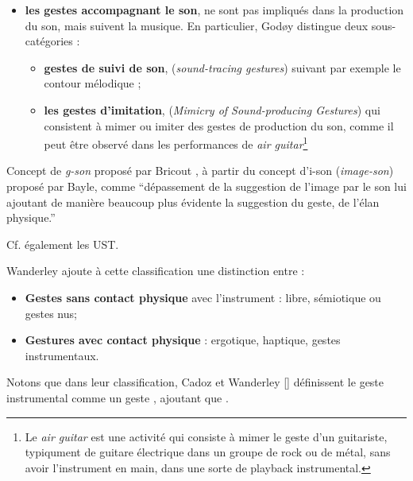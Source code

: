\begin{itemize}[noitemsep]
\item \textbf{les gestes accompagnant le son}, ne sont pas impliqués dans la production du son, mais suivent la musique. En particulier, Godøy distingue deux sous-catégories :
	\vspace{-1em}
	\begin{itemize}[noitemsep]
		\item \textbf{gestes de suivi de son}, (\textit{sound-tracing gestures}) suivant par exemple le contour mélodique \cite{godoy_exploring_2006};
		\item \textbf{les gestes d'imitation},  (\textit{Mimicry of Sound-producing Gestures}) qui consistent à mimer ou imiter des gestes de production du son, comme il peut être observé dans les performances de \textit{air guitar}\footnote{Le \textit{air guitar} est une activité qui consiste à mimer le geste d’un guitariste, typiqument de guitare électrique dans un groupe de rock ou de métal, sans avoir l’instrument en main, dans une sorte de playback instrumental.} \cite{godoy_playing_2005}
	\end{itemize}
\end{itemize}

Concept de \textit{g-son} proposé par Bricout \cite{bricout_les_2011}, à partir du concept d'i-son (\textit{image-son}) proposé par Bayle, comme ``dépassement de la suggestion de l'image par le son lui ajoutant de manière beaucoup plus évidente la suggestion du geste, de l'élan physique.''


Cf. également les UST.

\noindent Wanderley ajoute à cette classification une distinction entre :
\vspace{-1em}
\begin{itemize}[noitemsep]
\item \textbf{Gestes sans contact physique} avec l'instrument : libre, sémiotique ou gestes nus;
\item \textbf{Gestures avec contact physique} : ergotique, haptique, gestes instrumentaux.
\end{itemize}


Notons que dans leur classification, Cadoz et Wanderley [] définissent le geste instrumental comme un geste , ajoutant que .

